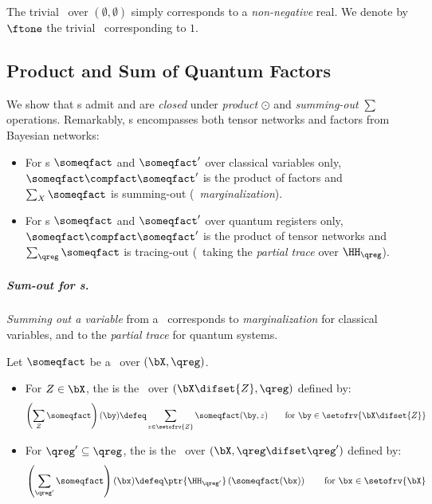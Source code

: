 The trivial \qfactor\ over $(\emptyset,\emptyset)$ simply corresponds to a \emph{non-negative} real.
We denote by $\ftone$ the trivial \qfactor\ corresponding to $1$.

\subsection{Product and Sum of Quantum Factors}

We show that \qfactor s admit and are \emph{closed} under \emph{product} $\odot$ and \emph{summing-out} $\sum$ operations.
Remarkably, \qfactor s encompasses both tensor networks and factors from Bayesian networks:
\begin{itemize}
\item
For \qfactor s $\someqfact$ and $\someqfact'$ over classical variables only, $\someqfact \compfact \someqfact'$ is the product of factors and $\sum_X \someqfact$ is summing-out (\aka\ \emph{marginalization}).
\item
For \qfactor s $\someqfact$ and $\someqfact'$ over quantum registers only, $\someqfact \compfact \someqfact'$ is the product of tensor networks %
and $\sum_\qreg \someqfact$ is tracing-out (\ie\ taking the \emph{partial trace} over $\HH_\qreg$).
\end{itemize}

\subparagraph*{Sum-out for \qfactor s.}
\emph{Summing out a variable} from a \qfactor\ corresponds to \emph{marginalization} for classical variables, and to the \emph{partial trace} for quantum systems.
\begin{definition}
\label{def:sum}
Let $\someqfact$ be a \qfactor\ over $(\bX,\qreg)$. 
\begin{itemize}
\item
For $Z \in \bX$, the  is the \qfactor\ over $(\bX \difset\{Z\},\qreg )$ defined by:
\begin{equation*}
\left(\sum_Z \someqfact\right) (\by) \defeq \sum_{z\in\setofrv{Z}} \someqfact (\by,z)
\qquad
\text{for $\by \in \setofrv{\bX \difset\{Z\}}$}
\end{equation*}
\item
For $\qreg' \subseteq \qreg $, the  is the \qfactor\ over $(\bX ,\qreg \difset\qreg')$ defined by:
\begin{equation*}
\left(\sum_{\qreg'} \someqfact\right) (\bx) \defeq \ptr{\HH_{\qreg'}}\left(\someqfact (\bx)\right)
\qquad
\text{for $\bx \in \setofrv{\bX}$}
\end{equation*}
\end{itemize}
\end{definition}

